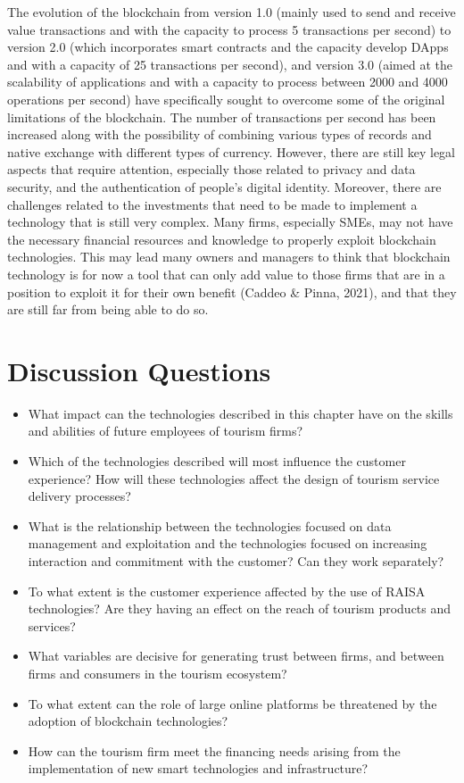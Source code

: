 \documentclass[
  letterpaper,
  DIV=11,
  numbers=noendperiod]{scrreprt}
\begin{document}
The evolution of the blockchain from version 1.0 (mainly used to send
and receive value transactions and with the capacity to process 5
transactions per second) to version 2.0 (which incorporates smart
contracts and the capacity develop DApps and with a capacity of 25
transactions per second), and version 3.0 (aimed at the scalability of
applications and with a capacity to process between 2000 and 4000
operations per second) have specifically sought to overcome some of the
original limitations of the blockchain. The number of transactions per
second has been increased along with the possibility of combining
various types of records and native exchange with different types of
currency. However, there are still key legal aspects that require
attention, especially those related to privacy and data security, and
the authentication of people's digital identity. Moreover, there are
challenges related to the investments that need to be made to implement
a technology that is still very complex. Many firms, especially SMEs,
may not have the necessary financial resources and knowledge to properly
exploit blockchain technologies. This may lead many owners and managers
to think that blockchain technology is for now a tool that can only add
value to those firms that are in a position to exploit it for their own
benefit (Caddeo \& Pinna, 2021), and that they are still far from being
able to do so.

\hypertarget{discussion-questions-10}{%
\section{Discussion Questions}\label{discussion-questions-10}}

\begin{itemize}
\item
  What impact can the technologies described in this chapter have on the
  skills and abilities of future employees of tourism firms?
\item
  Which of the technologies described will most influence the customer
  experience? How will these technologies affect the design of tourism
  service delivery processes?
\item
  What is the relationship between the technologies focused on data
  management and exploitation and the technologies focused on increasing
  interaction and commitment with the customer? Can they work
  separately?
\item
  To what extent is the customer experience affected by the use of RAISA
  technologies? Are they having an effect on the reach of tourism
  products and services?
\item
  What variables are decisive for generating trust between firms, and
  between firms and consumers in the tourism ecosystem?
\item
  To what extent can the role of large online platforms be threatened by
  the adoption of blockchain technologies?
\item
  How can the tourism firm meet the financing needs arising from the
  implementation of new smart technologies and infrastructure?
\end{itemize}
\end{document}
